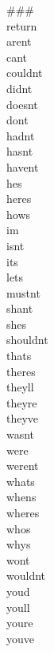 \begin{appendices}
\begin{multicols}{7}
\#\#\#\\
return\\
arent\\
cant\\
couldnt\\
didnt\\
doesnt\\
dont\\
hadnt\\
hasnt\\
havent\\
hes\\
heres\\
hows\\
im\\
isnt\\
its\\
lets\\
mustnt\\
shant\\
shes\\
shouldnt\\
thats\\
theres\\
theyll\\
theyre\\
theyve\\
wasnt\\
were\\
werent\\
whats\\
whens\\
wheres\\
whos\\
whys\\
wont\\
wouldnt\\
youd\\
youll\\
youre\\
youve\\
\end{multicols}

\end{appendices}
